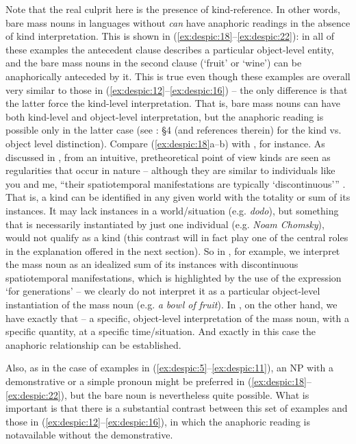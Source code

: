 \documentclass[output=paper,
modfonts
]{langscibook}
\begin{document}
	Note that the real culprit here is the presence of kind-reference. In other
	words, bare mass nouns in languages without  \textit{can} have anaphoric readings in the
	absence of kind interpretation. This is shown in (\ref{ex:despic:18}--\ref{ex:despic:22}): in all of these examples the antecedent
	clause describes a particular object-level entity, and the bare mass nouns in the second clause
	(`fruit' or `wine') can be anaphorically anteceded by it. This is true even though these examples
	are overall very similar to those in (\ref{ex:despic:12}--\ref{ex:despic:16}) -- the only difference is that the latter force the
	kind-level interpretation. 
	That is, bare mass nouns can have both kind-level and object-level interpretation, but the anaphoric reading is possible only in the latter case (see \citealt{Chierchia1998}: \S4 (and references therein) for the kind vs. object level distinction). Compare (\ref{ex:despic:18}a--b) with , for instance. As discussed in \citet{Chierchia1998}, from an intuitive, pretheoretical point of view kinds are seen as regularities that occur in nature -- although they are similar to individuals like you and me, ``their spatiotemporal manifestations are typically `discontinuous''' \citep[348]{Chierchia1998}. That is, a kind can be identified in any given world with the totality or sum of its instances. It may lack instances in a world/situation (e.g. \textit{dodo}), but something that is necessarily instantiated by just one individual (e.g. \textit{Noam Chomsky}), would not qualify as a kind (this contrast will in fact play one of the central roles in the explanation offered in the next section). So in , for example, we interpret the mass noun as an idealized sum of its instances with discontinuous spatiotemporal manifestations, which is highlighted by the use of the expression `for generations' -- we clearly do not interpret it as a particular object-level instantiation of the mass noun (e.g. \textit{a bowl of fruit}). In , on the other hand, we have exactly that -- a specific, object-level interpretation of the mass noun, with a specific quantity, at a specific time/situation. And exactly in this case the anaphoric relationship can be established. 
	
	Also, as in the case of examples in (\ref{ex:despic:5}--\ref{ex:despic:11}), an NP with a demonstrative or a simple pronoun might be preferred in (\ref{ex:despic:18}--\ref{ex:despic:22}), but the bare noun is nevertheless quite possible. What is important is that there is a substantial contrast between this set of examples and those in (\ref{ex:despic:12}--\ref{ex:despic:16}), in which the anaphoric reading is not\largerpage available without the demonstrative.\newpage
	
\end{document}
